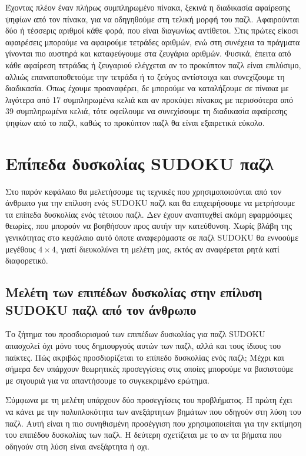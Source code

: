\documentclass[12pt]{book}
\theoremstyle{definition}
\begin{document}
Έχοντας πλέον έναν πλήρως συμπληρωμένο πίνακα, ξεκινά η διαδικασία αφαίρεσης ψηφίων από τον πίνακα, για να οδηγηθούμε στη τελική μορφή του παζλ. Αφαιρούνται δύο ή τέσσερις αριθμοί κάθε φορά, που είναι διαγωνίως αντίθετοι. Στις πρώτες είκοσι αφαιρέσεις μπορούμε να αφαιρούμε τετράδες αριθμών, ενώ στη συνέχεια τα πράγματα γίνονται πιο αυστηρά και καταφεύγουμε στα ζευγάρια αριθμών. Φυσικά, έπειτα από κάθε αφαίρεση τετράδας ή ζευγαριού ελέγχεται αν το προκύπτον παζλ είναι επιλύσιμο, αλλιώς επανατοποθετούμε την τετράδα ή το ζεύγος αντίστοιχα και συνεχίζουμε τη διαδικασία. Όπως έχουμε προαναφέρει, δε μπορούμε να καταλήξουμε σε πίνακα με λιγότερα από 17 συμπληρωμένα κελιά και αν προκύψει πίνακας με περισσότερα από 39 συμπληρωμένα κελιά, τότε οφείλουμε να συνεχίσουμε τη διαδικασία αφαίρεσης ψηφίων από το παζλ, καθώς το προκύπτον παζλ θα είναι εξαιρετικά εύκολο. \par

\chapter{Επίπεδα δυσκολίας SUDOKU παζλ}

Στο παρόν κεφάλαιο θα μελετήσουμε τις τεχνικές που χρησιμοποιούνται από τον άνθρωπο για την επίλυση ενός SUDOKU παζλ και θα επιχειρήσουμε να μετρήσουμε τα επίπεδα δυσκολίας ενός τέτοιου παζλ. Δεν έχουν αναπτυχθεί ακόμη εφαρμόσιμες θεωρίες, που μπορούν να βοηθήσουν προς αυτήν την κατεύθυνση. Χωρίς βλάβη της γενικότητας στο κεφάλαιο αυτό όποτε αναφερόμαστε σε παζλ SUDOKU θα εννοούμε μεγέθους \(4 \times 4\), γιατί διευκολύνει τη μελέτη μας, εκτός αν αναφέρεται ρητά κατί διαφορετικό. \par

\section{Μελέτη των επιπέδων δυσκολίας στην επίλυση SUDOKU παζλ από τον άνθρωπο}

Το ζήτημα του προσδιορισμού των επιπέδων δυσκολίας για παζλ SUDOKU απασχολεί όχι μόνο τους δημιουργούς αυτών των παζλ, αλλά και τους ίδιους του παίκτες. Πώς ακριβώς προσδιορίζεται το επίπεδο δυσκολίας ενός παζλ; Μέχρι και σήμερα δεν υπάρχουν θεωρητικές προσεγγίσεις στις οποίες μπορούμε να βασιστούμε με σιγουριά για να απαντήσουμε το συγκεκριμένο ερώτημα. \par 

Σύμφωνα με τη μελέτη \cite{5} υπάρχουν δύο προσεγγίσεις του προβλήματος. Η πρώτη έχει να κάνει με την πολυπλοκότητα των ανεξάρτητων βημάτων που οδηγούν στη λύση του παζλ. Αυτή είναι η πιο συνηθισμένη προσέγγιση που χρησιμοποιείται για την εκτίμηση του επιπέδου δυσκολίας των παζλ. Η δεύτερη σχετίζεται με το αν τα βήματα που οδηγούν στη λύση είναι ανεξάρτητα ή οχι. \par
\end{document}

